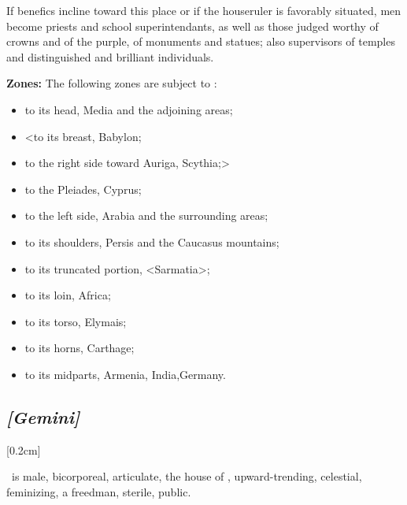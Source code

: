 If benefics incline toward this place or if the houseruler is favorably situated, men become priests and school superintendants, as well as those judged worthy of crowns and of the purple, of monuments and statues; also supervisors of temples and distinguished and brilliant individuals.

\textbf{Zones:} The following zones are subject to \Taurus: 
\begin{itemize}
\item to its head, Media and the adjoining areas; 
\item <to its breast, Babylon; 
\item to the right side toward Auriga, Scythia;> 
\item to the Pleiades, Cyprus; 
\item to the left side, Arabia and the surrounding areas; 
\item to its shoulders, Persis and the Caucasus mountains; 
\item to its truncated portion, <Sarmatia>; 
\item to its loin, Africa; 
\item to its torso, Elymais; 
\item to its horns, Carthage; 
\item to its midparts, Armenia, India,Germany.
\end{itemize}

\secbr
\subsection{\textit{[Gemini]}}
[0.2cm]

 \Gemini\, is  male,  bicorporeal, articulate, the house of \Mercury, upward-trending, celestial, feminizing, a freedman,  sterile, public. 

